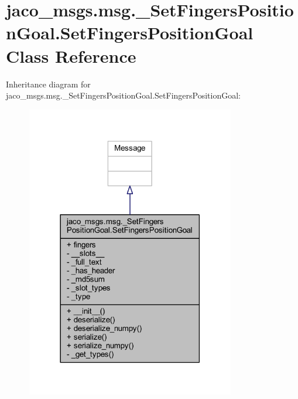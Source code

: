 \hypertarget{classjaco__msgs_1_1msg_1_1__SetFingersPositionGoal_1_1SetFingersPositionGoal}{}\section{jaco\+\_\+msgs.\+msg.\+\_\+\+Set\+Fingers\+Position\+Goal.\+Set\+Fingers\+Position\+Goal Class Reference}
\label{classjaco__msgs_1_1msg_1_1__SetFingersPositionGoal_1_1SetFingersPositionGoal}


Inheritance diagram for jaco\+\_\+msgs.\+msg.\+\_\+\+Set\+Fingers\+Position\+Goal.\+Set\+Fingers\+Position\+Goal\+:
\nopagebreak
\begin{figure}[H]
\begin{center}
\leavevmode
\includegraphics[width=258pt]{d2/d23/classjaco__msgs_1_1msg_1_1__SetFingersPositionGoal_1_1SetFingersPositionGoal__inherit__graph}
\end{center}
\end{figure}


